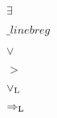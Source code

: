 \documentclass{article}
\begin{document}
$\exists$
\pagebreak

$\_linebr eg$
\pagebreak

$\lor$
\pagebreak

$>$
\pagebreak

$\lor_{\rm L}$
\pagebreak

$\Rightarrow_{\rm L}$
\pagebreak
\end{document}
